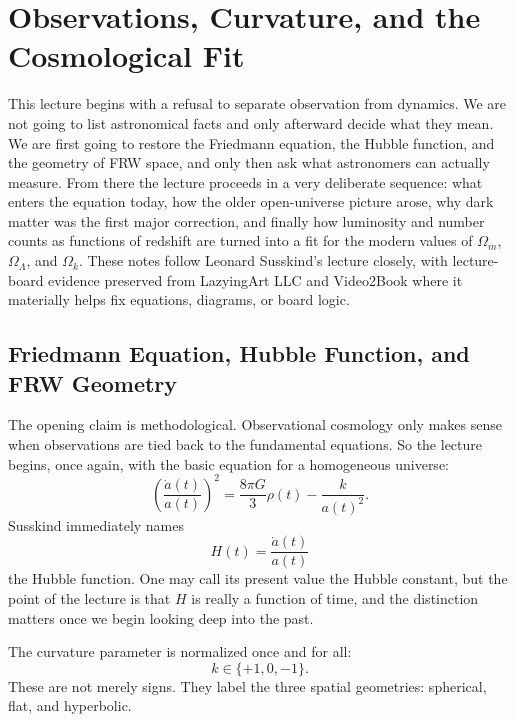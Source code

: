 \chapter{Observations, Curvature, and the Cosmological Fit}

This lecture begins with a refusal to separate observation from dynamics. We are not going to list astronomical facts and only afterward decide what they mean. We are first going to restore the Friedmann equation, the Hubble function, and the geometry of FRW space, and only then ask what astronomers can actually measure. From there the lecture proceeds in a very deliberate sequence: what enters the equation today, how the older open-universe picture arose, why dark matter was the first major correction, and finally how luminosity and number counts as functions of redshift are turned into a fit for the modern values of \(\Omega_m\), \(\Omega_\Lambda\), and \(\Omega_k\). These notes follow Leonard Susskind's lecture closely, with lecture-board evidence preserved from LazyingArt LLC and Video2Book where it materially helps fix equations, diagrams, or board logic.

\section{Friedmann Equation, Hubble Function, and FRW Geometry}

The opening claim is methodological. Observational cosmology only makes sense when observations are tied back to the fundamental equations. So the lecture begins, once again, with the basic equation for a homogeneous universe:
\begin{equation}
\left(\frac{\dot a(t)}{a(t)}\right)^2
=
\frac{8\pi G}{3}\rho(t)-\frac{k}{a(t)^2}.
\end{equation}
Susskind immediately names
\begin{equation}
H(t)=\frac{\dot a(t)}{a(t)}
\end{equation}
the Hubble function. One may call its present value the Hubble constant, but the point of the lecture is that \(H\) is really a function of time, and the distinction matters once we begin looking deep into the past.

The curvature parameter is normalized once and for all:
\begin{equation}
k\in\{+1,0,-1\}.
\end{equation}
These are not merely signs. They label the three spatial geometries: spherical, flat, and hyperbolic.


